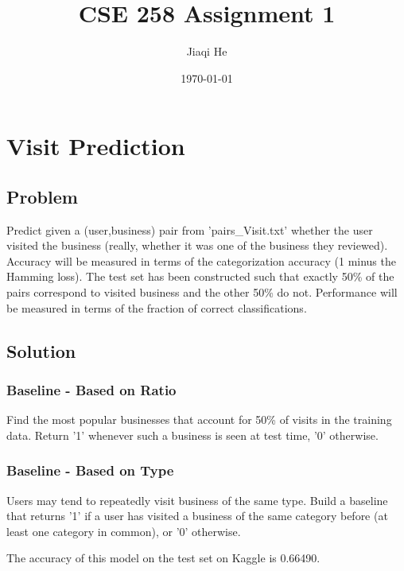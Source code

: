 \documentclass[a4paper]{article}
\title{CSE 258 Assignment 1}
\author{Jiaqi He}
\date{\today}
\begin{document}
\maketitle


\section{Visit Prediction}
\label{sec:visit}

\subsection{Problem}
Predict given a (user,business) pair from 'pairs\_Visit.txt' whether the user visited the business (really, whether it was one of the business they reviewed). Accuracy will be measured in terms of the categorization accuracy (1 minus the Hamming loss). The test set has been constructed such that exactly 50\% of the pairs correspond to visited business and the other 50\% do not. Performance will be measured in terms of the fraction of correct classifications.

\subsection{Solution}
\subsubsection{Baseline - Based on Ratio}
Find the most popular businesses that account for 50\% of visits in the training data. Return '1' whenever such a business is seen at test time, '0' otherwise.

\subsubsection{Baseline - Based on Type}
Users may tend to repeatedly visit business of the same type. Build a baseline that returns '1' if a user has visited a business of the same category before (at least one category in common), or '0' otherwise.\par
The accuracy of this model on the test set on Kaggle is 0.66490.
\end{document}
